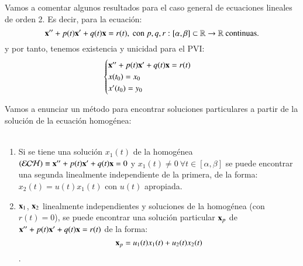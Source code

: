 Vamos a comentar algunos resultados para el caso general de ecuaciones lineales de orden 2. Es decir, para la ecuación:
$$
    \mathbf{x}'' + p(t)\mathbf{x}' + q(t)\mathbf{x} = r(t), \text{ con } p,q,r : [\alpha, \beta] \subset \mathbb{R} \to \mathbb{R} \text{ continuas.}
$$
y por tanto, tenemos existencia y unicidad para el PVI:
$$
    \begin{cases}
        \mathbf{x}'' + p(t)\mathbf{x}' + q(t)\mathbf{x} = r(t)\\
        x(t_0) = x_0\\
        x'(t_0) = y_0
    \end{cases}
$$
\begin{pro}
    Vamos a enunciar un método para encontrar soluciones particulares a partir de la solución de la ecuación homogénea:\\\\
\begin{enumerate}
    \item Si se tiene una solución $x_1(t)$ de la homogénea  $(\mathcal{ECH}) \equiv \mathbf{x}'' + p(t)\mathbf{x}' + q(t)\mathbf{x} = 0$ y $x_1(t) \neq 0\ \forall t \in [\alpha, \beta]$ se puede encontrar una segunda linealmente independiente de la primera, de la forma: $x_2(t) = u(t) x_1(t)$ con $u(t)$ apropiada.

    \item $\mathbf{x}_1$, $\mathbf{x}_2$ linealmente independientes y soluciones de la homogénea (con $r(t) = 0$), se puede encontrar una solución particular $\mathbf{x}_p$ de $\mathbf{x}'' + p(t)\mathbf{x}' + q(t)\mathbf{x} = r(t)$ de la forma:
    $$\mathbf{x}_p = u_1(t) x_1(t) + u_2(t)x_2(t)$$.
\end{enumerate}
\end{pro}

